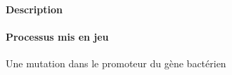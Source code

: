 \paragraph{Description} %
\label{par:buchnera_description}


\cite{dunbar2007}

\paragraph{Processus mis en jeu} %
\label{par:buchnera_process}

Une mutation dans le promoteur du gène bactérien 